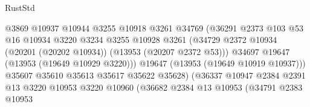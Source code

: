 \begin{lexlean}{RustStd}
\begin{coremodule}
                                            @3869
                                            @10937
                                            @10944
                                            @3255
                                            @10918
                                            @3261
                                            @34769
                                            (@36291
                                              @2373
                                              @103
                                              @53
                                              @16
                                              @10934
                                              @3220
                                              @3234
                                              @3255
                                              @10928
                                              @3261
                                              (@34729
                                                @2372
                                                @10934
                                                (@20201 (@20202 @10934))
                                                (@13953 (@20207 @2372 @53)))
                                              @34697
                                              @19647
                                              (@13953 (@19649 @10929 @3220)))
                                            @19647
                                            (@13953 (@19649 @10919 @10937)))
                                          @35607
                                          @35610
                                          @35613
                                          @35617
                                          @35622
                                          @35628)
                                        (@36337
                                          @10947
                                          @2384
                                          @2391
                                          @13
                                          @3220
                                          @10953
                                          @3220
                                          @10960
                                          (@36682
                                            @2384
                                            @13
                                            @10953
                                            (@34791
                                              @2383
                                              @10953

\end{coremodule}
\end{lexlean}
